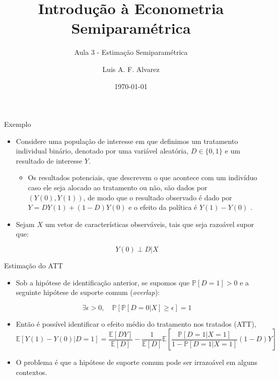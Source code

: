 \documentclass[11pt]{beamer}
\author{Luis A. F. Alvarez}
\title{Introdução à Econometria Semiparamétrica}
\subtitle{Aula 3 - Estimação Semiparamétrica}
\date{\today}
\begin{document}
	\begin{frame}[plain]
	\maketitle
	\end{frame}

	
	\begin{frame}{Exemplo}
		\begin{itemize}
			\item Considere uma população de interesse em que definimos um tratamento individual binário, denotado por uma variável aleatória, $D \in \{0,1\}$ e um resultado de interesse $Y$.
			\begin{itemize}
				\item Os resultados potenciais, que descrevem o que acontece com um indivíduo caso ele seja alocado ao tratamento ou não, são dados por $(Y(0),Y(1))$, de modo que o resultado observado é dado por $Y = DY(1)+(1-D)Y(0)$ e o efeito da política é $Y(1)-Y(0)$ .
			\end{itemize}
			\item Sejam $X$ um vetor de características observáveis, tais que seja razoável supor que:
			
			$$Y(0)\perp D | X$$
		\end{itemize}
	\end{frame}
	\begin{frame}{Estimação do ATT}
		\begin{itemize}
			\item Sob a hipótese de identificação anterior, se supomos que 	$\mathbb{P}[D=1]> 0$ e a seguinte hipótese de suporte comum (\textit{overlap}):
			
			$$\exists \epsilon > 0, \quad \mathbb{P}[\mathbb{P}[D=0|X]\geq \epsilon] = 1 $$
		
			\item Então é possível identificar o efeito médio do tratamento nos tratados (ATT), 
			{\small$$ \mathbb{E}[Y(1)-Y(0)|D=1] = \frac{\mathbb{E}[DY]}{\mathbb{E}[D]} - \frac{1}{\mathbb{E}[D]}\mathbb{E}\left[\frac{\mathbb{P}[D=1|X=1]}{1-\mathbb{P}[D=1|X=1]}(1-D)Y\right]$$}
			\item O problema é que a hipótese de suporte comum pode ser irrazoável em alguns contextos.
		\end{itemize}
	\end{frame}
	
\end{document}
